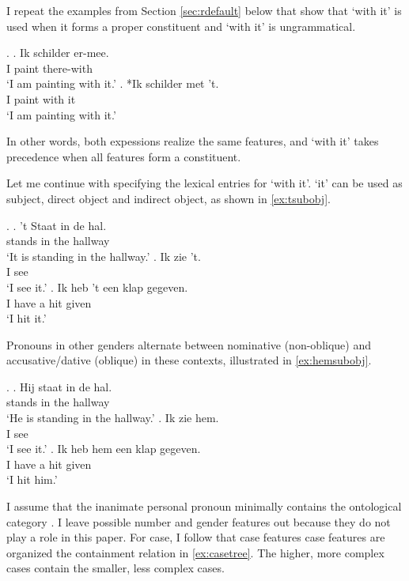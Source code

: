\documentclass{article}
\begin{document}
I repeat the examples from Section \ref{sec:rdefault} below that show that  `with it' is used when it forms a proper constituent and  `with it' is ungrammatical.

\ex.
\ag. Ik schilder er-mee.\\
 I paint there-with\\
 `I am painting with it.'\label{ex:jarmee}
\bg. *Ik schilder met 't.\\
 I paint with it\\
 `I am painting with it.'\label{ex:neemett}

In other words, both expessions realize the same features, and  `with it' takes precedence when all features form a constituent.

Let me continue with specifying the lexical entries for  `with it'.  `it' can be used as subject, direct object and indirect object, as shown in \ref{ex:tsubobj}.

\ex.\label{ex:tsubobj}
\ag. 't Staat in de hal.\\
  stands in the hallway\\
 `It is standing in the hallway.'
\bg. Ik zie 't.\\
 I see \\
 `I see it.'
\bg. Ik heb 't een klap gegeven.\\
 I have  a hit given\\
 `I hit it.'

Pronouns in other genders alternate between nominative (non-oblique) and accusative/dative (oblique) in these contexts, illustrated in \ref{ex:hemsubobj}.

\ex.\label{ex:hemsubobj}
\ag. Hij staat in de hal.\\
  stands in the hallway\\
 `He is standing in the hallway.'
\bg. Ik zie hem.\\
 I see \\
 `I see it.'
\bg. Ik heb hem een klap gegeven.\\
 I have  a hit given\\
 `I hit him.'

I assume that the inanimate personal pronoun minimally contains the ontological category  \citep{kayne2005}. I leave possible number and gender features out because they do not play a role in this paper. For case, I follow \citet{caha2009} that case features case features are organized the containment relation in \ref{ex:casetree}. The higher, more complex cases contain the smaller, less complex cases.
\end{document}
